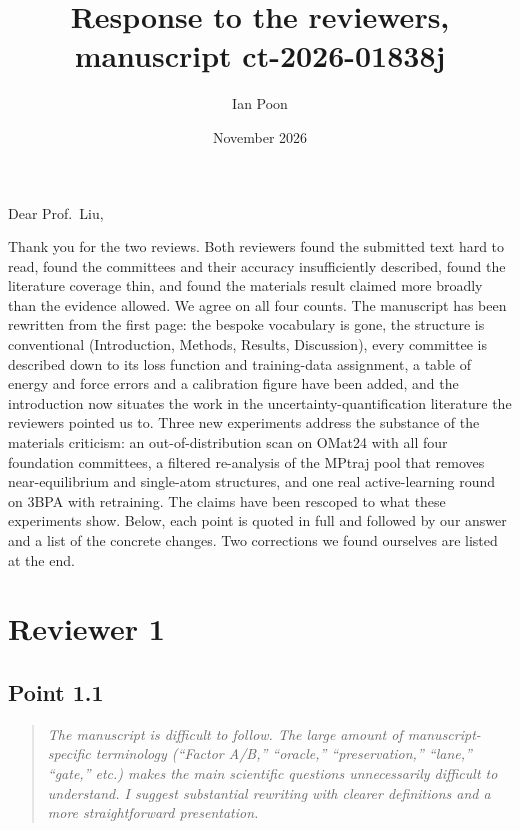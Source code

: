 \documentclass[11pt]{article}
\title{Response to the reviewers, manuscript ct-2026-01838j}
\author{Ian Poon}
\date{November 2026}
\newcommand{\rpoint}[1]{\begin{quote}\itshape #1\end{quote}}
\begin{document}
\maketitle

\noindent Dear Prof.\ Liu,

\medskip\noindent
Thank you for the two reviews. Both reviewers found the submitted text hard to
read, found the committees and their accuracy insufficiently described, found
the literature coverage thin, and found the materials result claimed more
broadly than the evidence allowed. We agree on all four counts. The manuscript
has been rewritten from the first page: the bespoke vocabulary is gone, the
structure is conventional (Introduction, Methods, Results, Discussion), every
committee is described down to its loss function and training-data assignment,
a table of energy and force errors and a calibration figure have been added,
and the introduction now situates the work in the uncertainty-quantification
literature the reviewers pointed us to. Three new experiments address the
substance of the materials criticism: an out-of-distribution scan on OMat24
with all four foundation committees, a filtered re-analysis of the MPtraj pool
that removes near-equilibrium and single-atom structures, and one real
active-learning round on 3BPA with retraining. The claims have been rescoped to
what these experiments show. Below, each point is quoted in full and followed
by our answer and a list of the concrete changes. Two corrections we found
ourselves are listed at the end.

\section*{Reviewer 1}

\subsection*{Point 1.1}
\rpoint{The manuscript is difficult to follow. The large amount of
manuscript-specific terminology (``Factor A/B,'' ``oracle,'' ``preservation,''
``lane,'' ``gate,'' etc.) makes the main scientific questions unnecessarily
difficult to understand. I suggest substantial rewriting with clearer
definitions and a more straightforward presentation.}
\end{document}

